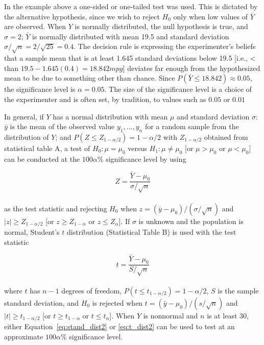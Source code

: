 \documentclass{WileySev}
\begin{document}
In the example above a one-sided or one-tailed test was used. This is dictated by the alternative hypothesis, since we wish to reject $H_0$ only when low values of $\bar{Y}$ are observed. When $Y$ is normally distributed, the null hypothesis is true, and $\sigma = 2$; $\bar{Y}$ is normally distributed with mean 19.5 and standard deviation $\sigma/\sqrt{n}=2/\sqrt{25}=0.4$. The decision rule is expressing the experimenter's beliefs that a sample mean that is at least 1.645 standard deviations below 19.5 [i.e., < than $19.5 - 1.645(0.4) = 18.842 mpg$] deviates far enough from the hypothesized mean to be due to something other than chance. Since $P(\bar{Y}\leq 18.842)\approx 0.05$, the significance level is $\alpha = 0.05$. The size of the significance level is a choice of the experimenter and is often set, by tradition, to values such as $0.05$ or $0.01$

In general, if $Y$ has a normal distribution with mean $\mu$ and standard deviation $\sigma$: $\bar{y}$ is the mean of the observed value $y_1,...,y_n$ for a random sample from the distribution of $Y$; and $P(Z\leq Z_{1-\alpha/2})=1-\alpha/2$ with $Z_{1-\alpha/2}$ obtained from statistical table A, a test of $H_0:\mu = \mu_0$ versus $H_1:\mu \neq \mu_0$ [or $\mu > \mu_0$ or $\mu < \mu_0$] can be conducted at the $100\alpha\%$ significance level by using

\begin{equation}
Z=\frac{\bar{Y}-\mu_0}{\sigma/\sqrt{n}}
\label{eq:stand_dist2}
\end{equation}
\\
as the test statistic and rejecting $H_0$ when $z = (\bar{y}-\mu_0)/(\sigma/\sqrt{n})$ and $|z| \geq Z_{1-\alpha/2}$ [or $z\geq Z_{1-\alpha}$ or $z\leq Z_{\alpha}$]. If $\sigma$ is unknown and the population is normal, Student's $t$ distribution (Statistical Table B) is used with the test statistic

\begin{equation}
t=\frac{\bar{Y}-\mu_0}{S/\sqrt{n}}
\label{eq:t_dist2}
\end{equation}
\\
where $t$ has $n-1$ degrees of freedom, $P(t\leq t_{1-\alpha/2})=1-\alpha/2$, $S$ is the sample standard deviation, and $H_0$ is rejected when $t=(\bar{y}-\mu_0)/(s/\sqrt{n})$ and $|t|\geq t_{1-\alpha/2}$ [or $t \geq t_{1-\alpha}$ or $t \leq t_{\alpha}$]. When $Y$ is nonnormal and $n$ is at least 30, either Equation~\ref{eq:stand_dist2} or \ref{eq:t_dist2} can be used to test at an approximate $100\alpha\%$ significance level.
\end{document}

